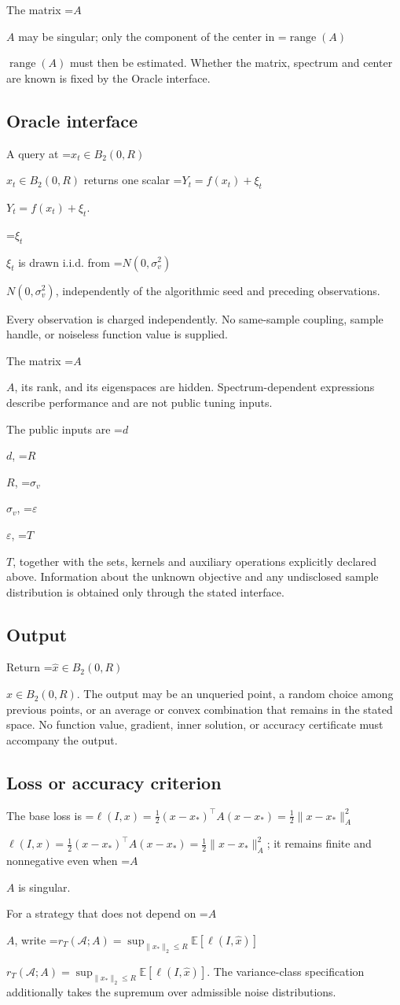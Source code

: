 \documentclass[10pt,a4paper]{article}
\newcommand{\AtlasMath}[1]{\par\begingroup\centering\setbox0=\hbox{$\displaystyle #1$}\ifdim\wd0>1.4\linewidth\typeout{ATLAS WIDE FORMULA: \the\wd0}\fi\ifdim\wd0>\linewidth\resizebox{\linewidth}{!}{\box0}\else\box0\fi\par\endgroup}
\newcommand{\AtlasInlineMath}[1]{\begingroup\setbox0=\hbox{$#1$}\ifdim\wd0>.4\linewidth\endgroup\AtlasMath{#1}\else\endgroup$#1$\fi}
\begin{document}
The matrix \AtlasInlineMath{A} may be singular; only the component of the center in \AtlasInlineMath{\operatorname{range}(A)} must then be estimated. Whether the matrix, spectrum and center are known is fixed by the Oracle interface.

\subsection{Oracle interface}
A query at \AtlasInlineMath{x_t\in B_2(0,R)} returns one scalar \AtlasInlineMath{Y_t=f(x_t)+\xi_t}.

\AtlasInlineMath{\xi_t} is drawn i.i.d. from \AtlasInlineMath{N(0,\sigma_v^2)}, independently of the algorithmic seed and preceding observations.

Every observation is charged independently. No same-sample coupling, sample handle, or noiseless function value is supplied.

The matrix \AtlasInlineMath{A}, its rank, and its eigenspaces are hidden. Spectrum-dependent expressions describe performance and are not public tuning inputs.

The public inputs are \AtlasInlineMath{d}, \AtlasInlineMath{R}, \AtlasInlineMath{\sigma_v}, \AtlasInlineMath{\varepsilon}, \AtlasInlineMath{T}, together with the sets, kernels and auxiliary operations explicitly declared above. Information about the unknown objective and any undisclosed sample distribution is obtained only through the stated interface.

\subsection{Output}
Return \AtlasInlineMath{\widehat{x}\in B_2(0,R)}. The output may be an unqueried point, a random choice among previous points, or an average or convex combination that remains in the stated space. No function value, gradient, inner solution, or accuracy certificate must accompany the output.

\subsection{Loss or accuracy criterion}
The base loss is \AtlasInlineMath{\ell(I,x)=\frac12(x-x_*)^\top A(x-x_*)=\frac12\|x-x_*\|_A^2}; it remains finite and nonnegative even when \AtlasInlineMath{A} is singular.

For a strategy that does not depend on \AtlasInlineMath{A}, write \AtlasInlineMath{r_T(\mathcal{A};A)=\sup_{\|x_*\|_2\le R}\mathbb{E}[\ell(I,\widehat{x})]}. The variance-class specification additionally takes the supremum over admissible noise distributions.
\end{document}
